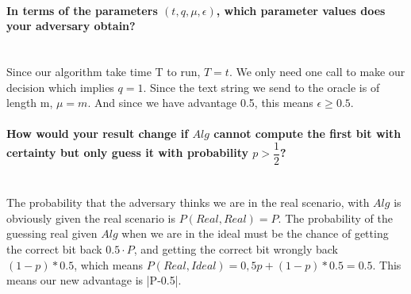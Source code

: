 \documentclass[paper=a4, fontsize=11pt]{scrartcl} %
\numberwithin{equation}{section} %
\numberwithin{figure}{section} %
\numberwithin{table}{section} %
\begin{document}
\paragraph{In terms of the parameters $(t,q,\mu, \epsilon)$, which parameter values does your adversary obtain?} \hspace{1cm} \\

Since our algorithm take time T to run, $T=t$. We only need one call to make our decision which implies $q=1$. Since the text string we send to the oracle is of length m, $\mu=m$. And since we have advantage 0.5, this means $\epsilon\geq0.5$.

\paragraph{How would your result change if $Alg$ cannot compute the first bit with certainty but only guess it with probability $p>\dfrac{1}{2}$?} \hspace{1cm} \\

The probability that the adversary thinks we are in the real scenario, with $Alg$ is obviously given the real scenario is $P(Real, Real)=P$. The probability of the guessing real given $Alg$ when we are in the ideal must be the chance of getting the correct bit back $0.5\cdot P$, and getting the correct bit wrongly back $(1-p)*0.5$, which means $P(Real, Ideal)=0,5p+(1-p)*0.5=0.5$. This means our new advantage is |P-0.5|.
\end{document}
